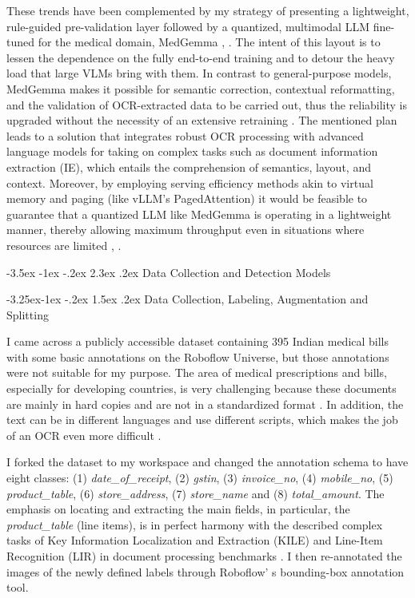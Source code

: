 \documentclass[conference,twocolumn]{IEEEtran}
\makeatletter
\renewcommand{\section}{\@startsection{section}{1}{\z@}%
  {-3.5ex \@plus -1ex \@minus -.2ex}%
  {2.3ex \@plus.2ex}%
  {\normalfont\large\bfseries\centering}}
\renewcommand{\subsection}{\@startsection{subsection}{2}{\z@}%
  {-3.25ex\@plus -1ex \@minus -.2ex}%
  {1.5ex \@plus .2ex}%
  {\normalfont\normalsize\bfseries\itshape}}
\makeatother
\begin{document}
These trends have been complemented by my strategy of presenting a
lightweight, rule-guided pre-validation layer followed by a quantized,
multimodal LLM fine-tuned for the medical domain, MedGemma \cite{ref3},
\cite{ref19}. The intent of this layout is to lessen the dependence on the
fully end-to-end training and to detour the heavy load that large VLMs
bring with them. In contrast to general-purpose models, MedGemma makes
it possible for semantic correction, contextual reformatting, and the
validation of OCR-extracted data to be carried out, thus the reliability
is upgraded without the necessity of an extensive retraining \cite{ref2}.
The mentioned plan leads to a solution that integrates robust OCR
processing with advanced language models for taking on complex tasks
such as document information extraction (IE), which entails the
comprehension of semantics, layout, and context. Moreover, by employing
serving efficiency methods akin to virtual memory and paging (like
vLLM's PagedAttention) it would be feasible to guarantee
that a quantized LLM like MedGemma is operating in a lightweight manner,
thereby allowing maximum throughput even in situations where resources are limited \cite{ref19}, \cite{ref20}.

\section{Data Collection and Detection Models}

\subsection{Data Collection, Labeling, Augmentation and Splitting}

I came across a publicly accessible dataset containing 395 Indian medical
bills with some basic annotations on the Roboflow Universe, but those
annotations were not suitable for my purpose. The area of medical
prescriptions and bills, especially for developing countries, is very
challenging because these documents are mainly in hard copies and are
not in a standardized format \cite{ref6}. In addition, the text can be in
different languages and use different scripts, which makes the job of an
OCR even more difficult \cite{ref5}.

I forked the dataset to my workspace and changed the annotation schema
to have eight classes: (1) \textit{date\_of\_receipt}, (2) \textit{gstin},
(3) \textit{invoice\_no}, (4) \textit{mobile\_no}, (5)
\textit{product\_table}, (6) \textit{store\_address}, (7) \textit{store\_name}
and (8) \textit{total\_amount}. The emphasis on locating and extracting
the main fields, in particular, the \textit{product\_table} (line items),
is in perfect harmony with the described complex tasks of Key
Information Localization and Extraction (KILE) and Line-Item Recognition
(LIR) in document processing benchmarks \cite{ref2}. I then re-annotated the
images of the newly defined labels through Roboflow' s
bounding-box annotation tool.
\end{document}

